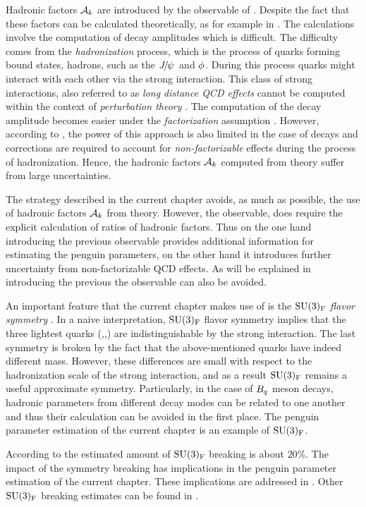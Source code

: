 Hadronic factors $\mathcal{A}_{k}$ are introduced by the  observable of .
Despite the fact that these factors can be calculated theoretically, as for example
in \cite{DeBruyn-thesis}. The calculations involve the computation of \BJpsiX decay amplitudes
which is difficult. The difficulty comes from the {\it hadronization} process, which is the
process of quarks forming bound states, hadrons, such as the ${J\mskip -3mu/\mskip -2mu\psi\mskip 2mu}$ and $\phi$.
During this process quarks might interact with each other via the strong interaction.
This class of strong interactions, also referred to as {\it long distance QCD effects}
cannot be computed within the context of {\it perturbation theory} \cite{DeBruyn:2014oga,DeBruyn-thesis}.
The computation of the \BJpsiX decay amplitude becomes easier under the
{\it factorization} assumption \cite{HAAN1970448,Wirbel1985,CABIBBO1978418,FAKIROV1978315}.
However, according to \cite{DeBruyn:2014oga,DeBruyn-thesis},
the power of this approach is also limited in the case of \BJpsiX decays and corrections
are required to account for {\it non-factorizable} effects during the process of hadronization.
Hence, the hadronic factors $\mathcal{A}_{k}$ computed from theory suffer from large uncertainties.

The strategy described in the current chapter avoids, as much as possible, the use of hadronic
factors $\mathcal{A}_{k}$ from theory. However, the  observable, does require the explicit
calculation of ratios of hadronic factors. Thus on the one hand
introducing the previous observable provides additional information for estimating the penguin
parameters, on the other hand it introduces further uncertainty from non-factorizable QCD effects.
As will be explained in  introducing the previous the 
observable can also be avoided.

An important feature that the current chapter makes use of is the
$\mathrm{SU}(3)_{\rm F}$ {\it flavor symmetry} \cite{GELLMANN1964214,NEEMAN1961222}.
In a naive interpretation, $\mathrm{SU}(3)_{\rm F}$ flavor symmetry implies that the three lightest quarks (\uquark,\dquark,\squark)
are indistinguishable by the strong interaction. The last symmetry is broken by the fact that the above-mentioned
quarks have indeed different mass. However, these differences are small with respect
to the hadronization scale \lqcd of the strong interaction, and as a result $\mathrm{SU}(3)_{\rm F}$
remains a useful approximate symmetry. Particularly, in the case of $B_q$ meson decays, hadronic
parameters from different decay modes can be related to one another and thus their calculation can be avoided
in the first place. The penguin parameter estimation of the current chapter is an example of $\mathrm{SU}(3)_{\rm F}$.

According to \cite{Nagashima:2007qn,Gronau:2013mda} the estimated amount of $\mathrm{SU}(3)_{\rm F}$ breaking is about $20\%$.
The impact of the symmetry breaking has implications in the penguin parameter estimation
of the current chapter. These implications are addressed in .
Other $\mathrm{SU}(3)_{\rm F}$ breaking estimates can be found in \cite{Charles:2015gya,PDG}.
